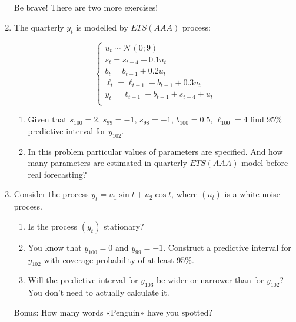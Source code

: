 \documentclass[12pt]{article}
\newcommand{\cN}{\mathcal{N}}
\begin{document}
\begin{enumerate}
    Be brave! There are two more exercises!
    \newpage

    \item The quarterly $y_t$ is modelled by $ETS(AAA)$ process:
    
    \[
    \begin{cases}
        u_t \sim \cN(0; 9) \\
        s_t = s_{t-4} + 0.1 u_t \\
        b_t = b_{t-1} + 0.2 u_t \\
        \ell_t = \ell_{t-1} + b_{t-1} + 0.3 u_t \\
        y_t = \ell_{t-1} + b_{t-1} + s_{t-4} + u_t \\
    \end{cases}    
    \]

    \begin{enumerate}
        \item Given that $s_{100} = 2$, $s_{99} = -1$, $s_{98}=-1$, $b_{100} = 0.5$, $\ell_{100} = 4$ find 95\% predictive interval for $y_{102}$. 
        \item In this problem particular values of parameters are specified. And how many parameters are estimated in quarterly $ETS(AAA)$ model before real forecasting?
    \end{enumerate}

    \item Consider the process $y_t = u_1 \sin t + u_2 \cos t$, where $(u_t)$ is a white noise process.
    \begin{enumerate}
        \item Is the process $(y_t)$ stationary?
        \item You know that $y_{100} = 0$ and $y_{99}=-1$. Construct a predictive interval for $y_{102}$ with coverage probability of at least 95\%. 
        \item Will the predictive interval for $y_{103}$ be wider or narrower than for $y_{102}$? You don't need to actually calculate it. 
    \end{enumerate}
    
    \item[Bonus:] How many words «Penguin» have you spotted?
    
 
\end{enumerate}
\end{document}
